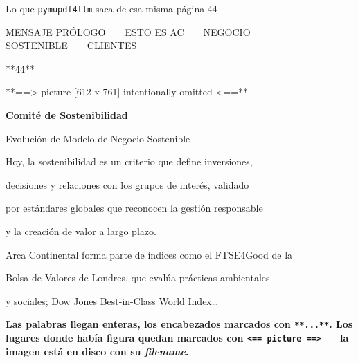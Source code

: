 \documentclass[aspectratio=169, 11pt]{beamer}
\begin{document}
\begin{frame}[shrink]{Lo que \texttt{pymupdf4llm} saca de esa misma página 44}
  \vspace{2pt}
  \begin{tcolorbox}[colback=arcaGray, colframe=codeGreen, leftrule=3pt,
    boxrule=0pt, sharp corners, left=8pt, right=8pt, top=4pt, bottom=4pt,
    title={\scriptsize\color{white}\bfseries\ttfamily pymupdf4llm.to\textunderscore markdown(...)},
    coltitle=white, colbacktitle=codeGreen, fonttitle=\scriptsize]
    {\scriptsize\color{textDark}\ttfamily
    MENSAJE PRÓLOGO~~~~ESTO ES AC~~~~NEGOCIO SOSTENIBLE~~~~CLIENTES\par
    \vspace{2pt}
    **44**\par
    \vspace{2pt}
    **==> picture [612 x 761] intentionally omitted <==**\par
    \vspace{2pt}
    \textbf{Comité de Sostenibilidad}\par
    Evolución de Modelo de Negocio Sostenible\par
    \vspace{2pt}
    Hoy, la sostenibilidad es un criterio que define inversiones,\par
    decisiones y relaciones con los grupos de interés, validado\par
    por estándares globales que reconocen la gestión responsable\par
    y la creación de valor a largo plazo.\par
    \vspace{2pt}
    Arca Continental forma parte de índices como el FTSE4Good de la\par
    Bolsa de Valores de Londres, que evalúa prácticas ambientales\par
    y sociales; Dow Jones Best-in-Class World Index\ldots\par}
  \end{tcolorbox}
  \vspace{4pt}
  \begin{tcolorbox}[colback=arcaRed!8, colframe=arcaRed, leftrule=3pt,
    boxrule=0pt, sharp corners, left=8pt, right=8pt, top=3pt, bottom=3pt]
    {\footnotesize\color{arcaDark}\bfseries
    Las palabras llegan enteras, los encabezados marcados con \texttt{**...**}.
    Los lugares donde había figura quedan marcados con \texttt{<== picture ==>}
    --- la imagen está en disco con su \emph{filename}.}
  \end{tcolorbox}
\end{frame}
\end{document}
